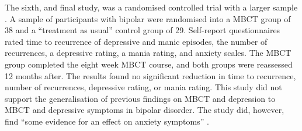 
The sixth, and final study, was a randomised controlled trial with a larger sample \cite{perich_randomized_2013}. A sample of participants with bipolar were randomised into a MBCT group of 38 and a “treatment as usual” control group of 29. Self-report questionnaires rated time to recurrence of depressive and manic episodes, the number of recurrences, a depressive rating, a mania rating, and anxiety scales. The MBCT group completed the eight week MBCT course, and both groups were reassessed 12 months after. The results found no significant reduction in time to recurrence, number of recurrences, depressive rating, or mania rating. This study did not support the generalisation of previous findings on MBCT and depression to MBCT and depressive symptoms in bipolar disorder. The study did, however, find “some evidence for an effect on anxiety symptoms” \cite{perich_randomized_2013}.
  
